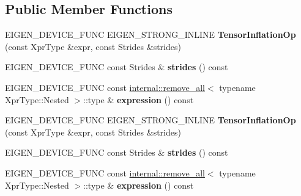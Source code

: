 \subsection*{Public Member Functions}
\begin{DoxyCompactItemize}
\item 
\mbox{\label{class_eigen_1_1_tensor_inflation_op_a16f2a510d49ead47bb7039b66cfdfd50}} 
E\+I\+G\+E\+N\+\_\+\+D\+E\+V\+I\+C\+E\+\_\+\+F\+U\+NC E\+I\+G\+E\+N\+\_\+\+S\+T\+R\+O\+N\+G\+\_\+\+I\+N\+L\+I\+NE {\bfseries Tensor\+Inflation\+Op} (const Xpr\+Type \&expr, const Strides \&strides)
\item 
\mbox{\label{class_eigen_1_1_tensor_inflation_op_a64b1b46f5d835146dd1275130807f7d0}} 
E\+I\+G\+E\+N\+\_\+\+D\+E\+V\+I\+C\+E\+\_\+\+F\+U\+NC const Strides \& {\bfseries strides} () const
\item 
\mbox{\label{class_eigen_1_1_tensor_inflation_op_af8ed3129839448d4e56a6ee7dc06c363}} 
E\+I\+G\+E\+N\+\_\+\+D\+E\+V\+I\+C\+E\+\_\+\+F\+U\+NC const \hyperlink{struct_eigen_1_1internal_1_1remove__all}{internal\+::remove\+\_\+all}$<$ typename Xpr\+Type\+::\+Nested $>$\+::type \& {\bfseries expression} () const
\item 
\mbox{\label{class_eigen_1_1_tensor_inflation_op_a16f2a510d49ead47bb7039b66cfdfd50}} 
E\+I\+G\+E\+N\+\_\+\+D\+E\+V\+I\+C\+E\+\_\+\+F\+U\+NC E\+I\+G\+E\+N\+\_\+\+S\+T\+R\+O\+N\+G\+\_\+\+I\+N\+L\+I\+NE {\bfseries Tensor\+Inflation\+Op} (const Xpr\+Type \&expr, const Strides \&strides)
\item 
\mbox{\label{class_eigen_1_1_tensor_inflation_op_a64b1b46f5d835146dd1275130807f7d0}} 
E\+I\+G\+E\+N\+\_\+\+D\+E\+V\+I\+C\+E\+\_\+\+F\+U\+NC const Strides \& {\bfseries strides} () const
\item 
\mbox{\label{class_eigen_1_1_tensor_inflation_op_af8ed3129839448d4e56a6ee7dc06c363}} 
E\+I\+G\+E\+N\+\_\+\+D\+E\+V\+I\+C\+E\+\_\+\+F\+U\+NC const \hyperlink{struct_eigen_1_1internal_1_1remove__all}{internal\+::remove\+\_\+all}$<$ typename Xpr\+Type\+::\+Nested $>$\+::type \& {\bfseries expression} () const
\end{DoxyCompactItemize}
